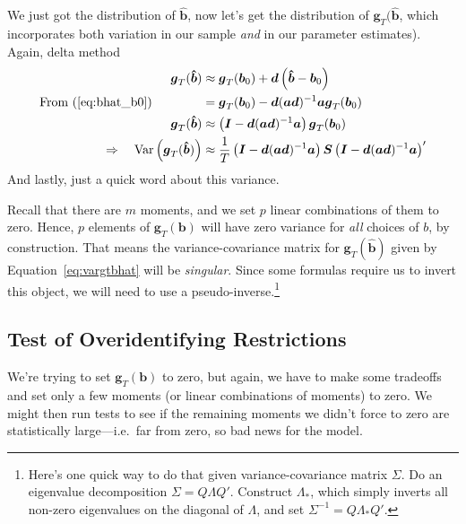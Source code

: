 \documentclass[12pt]{article}
\theoremstyle{plain}
\theoremstyle{definition}
\theoremstyle{remark}
\newcommand{\bsb}{\boldsymbol{b}}
\newcommand{\bshatb}{\boldsymbol{\hat{b}}}
\newcommand{\bsd}{\boldsymbol{d}}
\newcommand{\bsg}{\boldsymbol{g}}
\newcommand{\bsS}{\boldsymbol{S}}
\begin{document}
\begin{enumerate}
    We just got the distribution of $\bshatb$, now let's
    get the distribution of $\bsg_T(\bshatb$,
    which incorporates both variation in our sample \emph{and} in our
    parameter estimates). Again, delta method
    \begin{align}
      \bsg_T(\bshatb)
      &\approx
      \bsg_T(\bsb_0)
      + \bsd
      \left(\bshatb-\bsb_0\right)\notag\\
      \text{From (\ref{eq:bhat_b0})}
      \qquad\qquad
      &=
      \bsg_T(\bsb_0)
      -\bsd(\boldsymbol{a} \bsd)^{-1}
      \boldsymbol{a} \bsg_T(\bsb_0)\notag \\
      \bsg_T(\bshatb)
      &\approx
      \left(\boldsymbol{I}
      -\bsd(\boldsymbol{a} \bsd)^{-1}
      \boldsymbol{a} \right)
      \bsg_T(\bsb_0)\notag\\
      \Rightarrow\quad
      \text{Var}\left(
      \bsg_T(\bshatb)
      \right)
      &\approx
      \frac{1}{T}
      \left(\boldsymbol{I}
      -\bsd(\boldsymbol{a} \bsd)^{-1}
      \boldsymbol{a} \right)
      \bsS
      \left(\boldsymbol{I}
      -\bsd(\boldsymbol{a} \bsd)^{-1}
      \boldsymbol{a} \right)'
      \label{eq:vargtbhat}
    \end{align}
    And lastly, just a quick word about this variance.

    Recall that there are $m$ moments, and we set $p$ linear
    combinations of them to zero. Hence, $p$ elements of
    $\bsg_T(\bsb)$ will have zero variance
    for \emph{all} choices of $b$, by construction. That means the
    variance-covariance matrix for
    $\bsg_T(\bshatb)$ given by
    Equation~\ref{eq:vargtbhat} will be \emph{singular}.  Since some
    formulas require us to invert this object, we will need to use a
    pseudo-inverse.\footnote{Here's one quick way to do that given
      variance-covariance matrix $\Sigma$. Do an eigenvalue
      decomposition $\Sigma = Q\Lambda Q'$. Construct $\Lambda_*$, which
      simply inverts all non-zero eigenvalues on the diagonal of
      $\Lambda$, and set $\Sigma^{-1}=Q\Lambda_*Q'$.}

\end{enumerate}

\subsection{Test of Overidentifying Restrictions}

We're trying to set $\bsg_T(\bsb)$ to zero, but
again, we have to make some tradeoffs and set only a few moments (or
linear combinations of moments) to zero. We might then run tests to see
if the remaining moments we didn't force to zero are statistically
large---i.e.\ far from zero, so bad news for the model.
\end{document}
